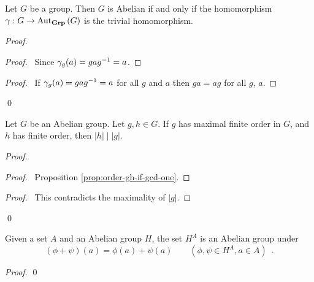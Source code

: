 \begin{prop}
    Let $G$ be a group. Then $G$ is Abelian if and only if the homomorphism $\gamma : G \rightarrow \mathrm{Aut}_{\mathbf{Grp}} \left( {G} \right)$ is the trivial homomorphism.
\end{prop}

\begin{proof}
    \pf
    \begin{proof}
        \pf\ Since $\gamma_g(a) = ga{g}^{-1} = a$.
    \end{proof}
    \begin{proof}
        \pf\ If $\gamma_g(a) = ga{g}^{-1} = a$ for all $g$ and $a$ then $ga = ag$ for all $g$, $a$.
    \end{proof}
    \qed
\end{proof}

\begin{prop}
    \label{prop:maximal-finite-order}
    Let $G$ be an Abelian group. Let $g,h \in G$. If $g$ has maximal finite order in $G$, and $h$ has finite order, then $|h| \mid |g|$.
\end{prop}

\begin{proof}
    \pf
    \begin{proof}
        \pf\ Proposition \ref{prop:order-gh-if-gcd-one}.
    \end{proof}
    \qedstep
    \begin{proof}
        \pf\ This contradicts the maximality of $|g|$.
    \end{proof}
    \qed
\end{proof}

\begin{prop}
    Given a set $A$ and an Abelian group $H$, the set $H^A$ is an Abelian group under
    \[ (\phi + \psi)(a) = \phi(a) + \psi(a) \qquad (\phi,\psi \in H^A, a \in A) \enspace . \]
\end{prop}

\begin{proof}
    \pf
    \qed
\end{proof}

